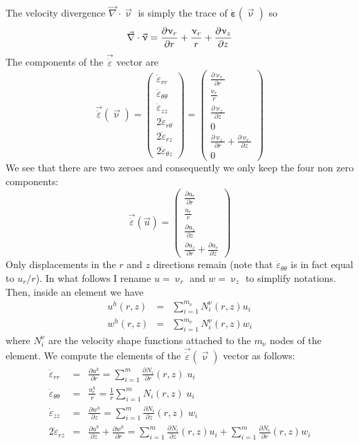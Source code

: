 The velocity divergence $\vec\nabla \cdot \vec{\upnu}$ is simply the trace of $\dot{\bm \varepsilon}(\vec{\upnu})$ so 
\[
\vec\nabla \cdot \vec{\upnu}
= {\partial \upnu_r \over \partial r} +{\upnu_r \over r}
+{\partial \upnu_{z} \over \partial z}
\]
The components of the $\vec{\dot{\varepsilon}}$ vector are
\[
\vec{\dot{\varepsilon}}(\vec \upnu)
=
\left(
\begin{array}{c}
\dot\varepsilon_{rr} \\
\dot\varepsilon_{\theta\theta} \\
\dot\varepsilon_{zz} \\
2\dot\varepsilon_{r\theta} \\
2\dot\varepsilon_{rz} \\
2\dot\varepsilon_{\theta z} 
\end{array}
\right)
=
\left(
\begin{array}{c}
\frac{\partial \upnu_r}{\partial r} \\ 
\frac{\upnu_r}{r} \\ 
\frac{\partial \upnu_z}{\partial z} \\ 
0 \\ 
\frac{\partial \upnu_z}{\partial r}+\frac{\partial \upnu_r}{\partial z} \\ 
0
\end{array}
\right)
\]
We see that there are two zeroes and consequently
we only keep the four non zero components:
\[
\vec{\dot{\varepsilon}}(\vec u)
=
\left(
\begin{array}{c}
\frac{\partial u_r}{\partial r} \\ 
\frac{u_r}{r} \\ 
\frac{\partial u_z}{\partial z} \\ 
\frac{\partial u_z}{\partial r}+\frac{\partial u_r}{\partial z} 
\end{array}
\right)
\]
Only displacements in the $r$ and $z$ directions remain (note that $\dot\varepsilon_{\theta\theta}$ is in fact equal to $u_r/r$). In what follows I rename $u=\upnu_r$ and $w=\upnu_z$ to simplify notations. 
Then, inside an element we have 
\begin{eqnarray}
u^h(r,z) &=& \sum_{i=1}^{m_\upnu} N_i^\upnu(r,z) u_i \nonumber\\
w^h(r,z) &=& \sum_{i=1}^{m_\upnu} N_i^\upnu(r,z) w_i
\end{eqnarray}
where $N_i^\upnu$ are the velocity shape functions attached 
to the $m_\upnu$ nodes of the element.
We compute the elements of the $\vec{\dot{\varepsilon}}(\vec\upnu)$ vector as follows:
\begin{eqnarray}
\dot\varepsilon_{rr} &=&
\frac{\partial u^h}{\partial r} 
= \sum_{i=1}^m \frac{\partial N_i}{\partial r}(r,z) \; u_i \\
\dot\varepsilon_{\theta\theta} &=& \frac{u_r^h}{r} = 
\frac{1}{r}\sum_{i=1}^m N_i(r,z) \;  u_i \\
\dot\varepsilon_{zz} &=& 
\frac{\partial w^h}{\partial z}
= \sum_{i=1}^m \frac{\partial N_i}{\partial z}(r,z) \; w_i \\
2\dot\varepsilon_{rz} &=& \frac{\partial u^h}{\partial z}
+ \frac{\partial w^h}{\partial r}
= \sum_{i=1}^m \frac{\partial N_i}{\partial z}(r,z) u_i 
+ \sum_{i=1}^m \frac{\partial N_i}{\partial r}(r,z) w_i 
\end{eqnarray}
